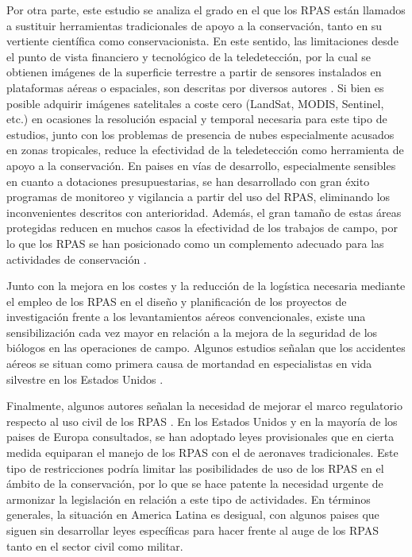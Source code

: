 \documentclass[11pt,]{article}
\begin{document}
Por otra parte, este estudio se analiza el grado en el que los RPAS
están llamados a sustituir herramientas tradicionales de apoyo a la
conservación, tanto en su vertiente científica como conservacionista. En
este sentido, las limitaciones desde el punto de vista financiero y
tecnológico de la teledetección, por la cual se obtienen imágenes de la
superficie terrestre a partir de sensores instalados en plataformas
aéreas o espaciales, son descritas por diversos autores \citep{Koh2012}.
Si bien es posible adquirir imágenes satelitales a coste cero (LandSat,
MODIS, Sentinel, etc.) en ocasiones la resolución espacial y temporal
necesaria para este tipo de estudios, junto con los problemas de
presencia de nubes especialmente acusados en zonas tropicales, reduce la
efectividad de la teledetección como herramienta de apoyo a la
conservación. En paises en vías de desarrollo, especialmente sensibles
en cuanto a dotaciones presupuestarias, se han desarrollado con gran
éxito programas de monitoreo y vigilancia a partir del uso del RPAS,
eliminando los inconvenientes descritos con anterioridad. Además, el
gran tamaño de estas áreas protegidas reducen en muchos casos la
efectividad de los trabajos de campo, por lo que los RPAS se han
posicionado como un complemento adecuado para las actividades de
conservación \citep{Zahawi2015}.

Junto con la mejora en los costes y la reducción de la logística
necesaria mediante el empleo de los RPAS en el diseño y planificación de
los proyectos de investigación frente a los levantamientos aéreos
convencionales, existe una sensibilización cada vez mayor en relación a
la mejora de la seguridad de los biólogos en las operaciones de campo.
Algunos estudios señalan que los accidentes aéreos se situan como
primera causa de mortandad en especialistas en vida silvestre en los
Estados Unidos \citep{Sasse2003}.

Finalmente, algunos autores señalan la necesidad de mejorar el marco
regulatorio respecto al uso civil de los RPAS \citep{Nugraha2016}. En
los Estados Unidos y en la mayoría de los paises de Europa consultados,
se han adoptado leyes provisionales que en cierta medida equiparan el
manejo de los RPAS con el de aeronaves tradicionales. Este tipo de
restricciones podría limitar las posibilidades de uso de los RPAS en el
ámbito de la conservación, por lo que se hace patente la necesidad
urgente de armonizar la legislación en relación a este tipo de
actividades. En términos generales, la situación en America Latina es
desigual, con algunos paises que siguen sin desarrollar leyes
específicas para hacer frente al auge de los RPAS tanto en el sector
civil como militar.
\end{document}
